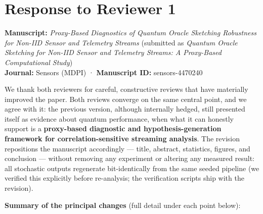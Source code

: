 \documentclass[
  11pt,
]{article}
\author{}
\date{}
\begin{document}
\section{Response to Reviewer 1}\label{response-to-reviewer-1}

\textbf{Manuscript:} \emph{Proxy-Based Diagnostics of Quantum Oracle
Sketching Robustness for Non-IID Sensor and Telemetry Streams}
(submitted as \emph{Quantum Oracle Sketching for Non-IID Sensor and
Telemetry Streams: A Proxy-Based Computational Study})\\
\textbf{Journal:} Sensors (MDPI) · \textbf{Manuscript ID:}
sensors-4470240

We thank both reviewers for careful, constructive reviews that have
materially improved the paper. Both reviews converge on the same central
point, and we agree with it: the previous version, although internally
hedged, still presented itself as evidence about quantum performance,
when what it can honestly support is a \textbf{proxy-based diagnostic
and hypothesis-generation framework for correlation-sensitive streaming
analysis}. The revision repositions the manuscript accordingly ---
title, abstract, statistics, figures, and conclusion --- without
removing any experiment or altering any measured result: all stochastic
outputs regenerate bit-identically from the same seeded pipeline (we
verified this explicitly before re-analysis; the verification scripts
ship with the revision).

\textbf{Summary of the principal changes} (full detail under each point
below):
\end{document}
